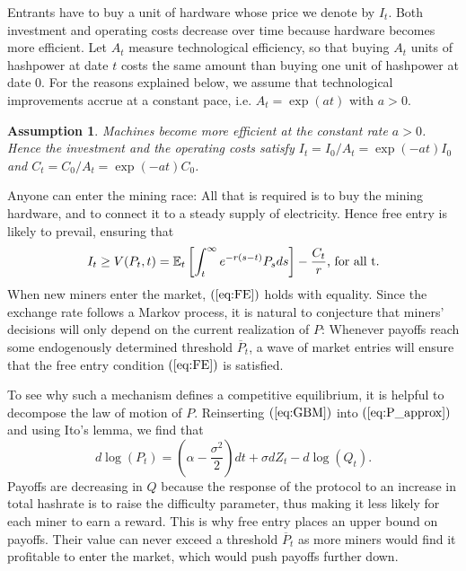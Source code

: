 \documentclass[12pt, a4paper]{article}
\newtheorem{hyp}{Assumption}
\begin{document}
Entrants have to buy a unit of hardware whose price we denote by $I_{t}$. Both investment
and operating costs decrease over time because hardware becomes
more efficient. Let $A_t$ measure technological efficiency, so that
buying $A_t$ units of hashpower at date $t$ costs the same amount than buying
one unit of hashpower at date $0$. For the reasons explained below, we assume that
technological improvements accrue at a constant pace, i.e. $A_t=\exp(at)$ with $a>0$.

\begin{hyp}
\label{hyp:rate_TP} Machines become more efficient at the constant rate $a>0$.
Hence the investment and the operating costs satisfy $I_t=I_0/A_t=\exp(-at)I_0$ and $%
C_t=C_0/A_t=\exp(-at)C_0$.
\end{hyp}


Anyone can enter the mining race: All that is required
is to buy the mining hardware, and to connect it to a steady supply of electricity. Hence
free entry is likely to prevail, ensuring that
\begin{equation}
I_{t}\geq V(P_{t},t)=\mathbb{E}_{t}\left[ \int_{t}^{\infty }e^{-r(s-t)}P_{s}ds\right] -\frac{%
C_{t}}{r }\text{, for all t}.  \label{eq:FE}
\end{equation}%
When new miners enter the market, $\left( \ref{eq:FE}\right) $
holds with equality. Since the exchange rate follows a Markov process, it is
natural to conjecture that miners' decisions will only depend on the current
realization of $P$: Whenever payoffs reach some endogenously determined
threshold $\overline{P}_{t}$, a wave of market entries will ensure that the
free entry condition $\left( \ref{eq:FE}\right) $ is satisfied.

To see why such a mechanism defines a competitive equilibrium, it is helpful
to decompose the law of motion of $P$. Reinserting $\left( \ref{eq:GBM}%
\right) $ into $\left( \ref{eq:P_approx}\right) $ and using Ito's lemma, we
find that%
\begin{equation}
d\log (P_{t})=\left(\alpha-\frac{\sigma^2}{2}\right) dt+\sigma dZ_{t}-d\log
(Q_{t}).  \label{dlogP}
\end{equation}%
Payoffs are decreasing in $Q$ because the response of the protocol to an
increase in total hashrate is to raise the difficulty
parameter, thus making it less likely for each miner to earn a reward. This
is why free entry places an upper bound on payoffs. Their value can never
exceed a threshold $\overline{P}_{t}$ as more miners would find it
profitable to enter the market, which would push payoffs further down.
\end{document}
